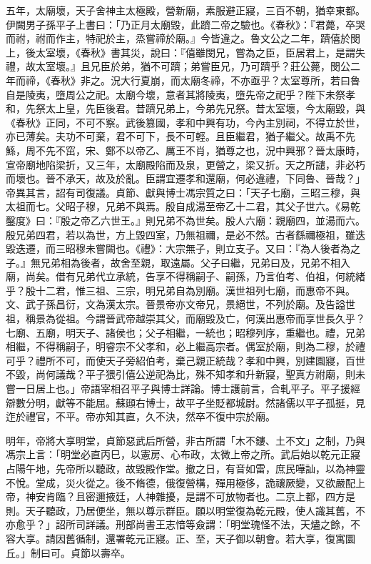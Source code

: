 \begin{pinyinscope}
 五年，太廟壞，天子舍神主太極殿，營新廟，素服避正寢，三百不朝，猶幸東都。伊闕男子孫平子上書曰：「乃正月太廟毀，此躋二帝之驗也。《春秋》：『君薨，卒哭而祔，祔而作主，特祀於主，烝嘗禘於廟。』今皆違之。魯文公之二年，躋僖於閔上，後太室壞，《春秋》書其災，說曰：『僖雖閔兄，嘗為之臣，臣居君上，是謂失禮，故太室壞。』且兄臣於弟，猶不可躋；弟嘗臣兄，乃可躋乎？莊公薨，閔公二年而禘，《春秋》非之。況大行夏崩，而太廟冬禘，不亦亟乎？太室尊所，若曰魯自是陵夷，墮周公之祀。太廟今壞，意者其將陵夷，墮先帝之祀乎？陛下未祭孝和，先祭太上皇，先臣後君。昔躋兄弟上，今弟先兄祭。昔太室壞，今太廟毀，與《春秋》正同，不可不察。武後篡國，孝和中興有功，今內主別祠，不得立於世，亦已薄矣。夫功不可棄，君不可下，長不可輕。且臣繼君，猶子繼父。故禹不先鯀，周不先不窋，宋、鄭不以帝乙、厲王不肖，猶尊之也，況中興邪？晉太康時，宣帝廟地陷梁折，又三年，太廟殿陷而及泉，更營之，梁又折。天之所譴，非必朽而壞也。晉不承天，故及於亂。臣謂宜遷孝和還廟，何必違禮，下同魯、晉哉？」帝異其言，詔有司復議。貞節、獻與博士馮宗質之曰：「天子七廟，三昭三穆，與太祖而七。父昭子穆，兄弟不與焉。殷自成湯至帝乙十二君，其父子世六。《易乾鑿度》曰：『殷之帝乙六世王。』則兄弟不為世矣。殷人六廟：親廟四，並湯而六。殷兄弟四君，若以為世，方上毀四室，乃無祖禰，是必不然。古者繇禰極祖，雖迭毀迭遷，而三昭穆未嘗闕也。《禮》：大宗無子，則立支子。又曰：『為人後者為之子。』無兄弟相為後者，故舍至親，取遠屬。父子曰繼，兄弟曰及，兄弟不相入廟，尚矣。借有兄弟代立承統，告享不得稱嗣子、嗣孫，乃言伯考、伯祖，何統緒乎？殷十二君，惟三祖、三宗，明兄弟自為別廟。漢世祖列七廟，而惠帝不與。文、武子孫昌衍，文為漢太宗。晉景帝亦文帝兄，景絕世，不列於廟。及告謚世祖，稱景為從祖。今謂晉武帝越崇其父，而廟毀及亡，何漢出惠帝而享世長久乎？七廟、五廟，明天子、諸侯也；父子相繼，一統也；昭穆列序，重繼也。禮，兄弟相繼，不得稱嗣子，明睿宗不父孝和，必上繼高宗者。偶室於廟，則為二穆，於禮可乎？禮所不可，而使天子旁紹伯考，棄己親正統哉？孝和中興，別建園寢，百世不毀，尚何議哉？平子猥引僖公逆祀為比，殊不知孝和升新寢，聖真方祔廟，則未嘗一日居上也。」帝語宰相召平子與博士詳論。博士護前言，合軋平子。平子援經辯數分明，獻等不能屈。蘇頲右博士，故平子坐貶都城尉。然諸儒以平子孤挺，見迮於禮官，不平。帝亦知其直，久不決，然卒不復中宗於廟。



 明年，帝將大享明堂，貞節惡武后所營，非古所謂「木不鏤、土不文」之制，乃與馮宗上言：「明堂必直丙巳，以憲房、心布政，太微上帝之所。武后始以乾元正寢占陽午地，先帝所以聽政，故毀殿作堂。撤之日，有音如雷，庶民嘩訕，以為神靈不悅。堂成，災火從之。後不脩德，俄復營構，殫用極侈，詭禳厥變，又欲嚴配上帝，神安肯臨？且密邇掖廷，人神雜擾，是謂不可放物者也。二京上都，四方是則。天子聽政，乃居便坐，無以尊示群臣。願以明堂復為乾元殿，使人識其舊，不亦愈乎？」詔所司詳議。刑部尚書王志愔等僉謂：「明堂瑰怪不法，天燼之餘，不容大享。請因舊循制，還署乾元正寢。正、至，天子御以朝會。若大享，復寓圜丘。」制曰可。貞節以壽卒。




\end{pinyinscope}
